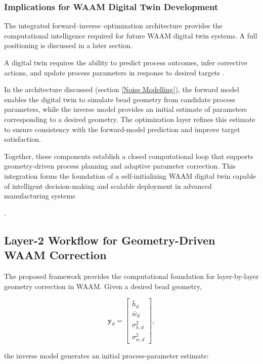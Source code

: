 \documentclass[11pt]{article}
\begin{document}
\subsubsection{Implications for WAAM Digital Twin Development}


The integrated forward–inverse–optimization architecture provides the computational intelligence 
required for future WAAM digital twin systems. A full positioning is discussed in a later section.

A digital twin requires the ability to predict process outcomes, infer corrective actions, and update process parameters in response to desired targets \cite{Fuller2020,Tao2018}.

In the architecture discussed 
(section \ref{Noise Modelling}), the forward model enables the digital twin to simulate bead geometry from candidate process parameters, while the inverse model provides an initial estimate of parameters corresponding to a desired geometry. The optimization layer refines this estimate to ensure consistency with the forward-model prediction and improve target satisfaction.

Together, these components establish a closed computational loop that supports geometry-driven process planning and adaptive parameter correction. This integration forms the foundation of a self-initializing WAAM digital twin capable of intelligent decision-making and scalable deployment in advanced manufacturing systems \cite{Liu2025DTWAAM,Zhao2024DTWAAM}


.

\subsection{Layer-2 Workflow for Geometry-Driven WAAM Correction}

The proposed framework provides the computational foundation for layer-by-layer geometry correction in WAAM. Given a desired bead geometry,

\begin{equation}
\mathbf{y}_{d} =
\begin{bmatrix}
\bar{h}_{d} \\
\bar{w}_{d} \\
\sigma_{h,d}^{2} \\
\sigma_{w,d}^{2}
\end{bmatrix},
\end{equation}

the inverse model generates an initial process-parameter estimate:
\end{document}
